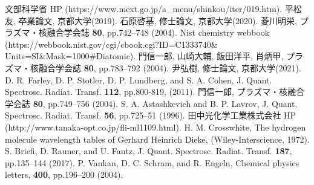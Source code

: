 \begin{thebibliography}{99}
     文部科学省 HP (https://www.mext.go.jp/a\_menu/shinkou/iter/019.htm).
     平松友, 卒業論文, 京都大学(2019).
     石原啓基, 修士論文, 京都大学(2020).
     菱川明栄, プラズマ・核融合学会誌 \textbf{80}, pp.742–748 (2004).
     Nist chemistry webbook (https://webbook.nist.gov/cgi/cbook.cgi?ID=C1333740\&\\Units=SI\&Mask=1000\#Diatomic).
     門信一郎, 山崎大輔, 飯田洋平, 肖炳甲, プラズマ・核融合学会誌 \textbf{80}, pp.783–792 (2004).
     尹弘樹, 修士論文, 京都大学(2021).
     D. R. Farley, D. P. Stotler, D. P. Lundberg, and S. A. Cohen, J. Quant. Spectrosc. Radiat. Transf. \textbf{112}, pp.800-819, (2011).
     門信一郎, プラズマ・核融合学会誌 \textbf{80}, pp.749–756 (2004).
     S. A. Astashkevich and B. P. Lavrov, J. Quant. Spectrosc. Radiat. Transf. \textbf{56}, pp.725–51 (1996).
     田中光化学工業株式会社 HP (http://www.tanaka-opt.co.jp/fli-ml1109.html).
     H. M. Crosswhite, The hydrogen molecule wavelength tables of Gerhard Heinrich Dieke, (Wiley-Interscience, 1972).
     S. Briefi, D. Rauner, and U. Fantz, J. Quant. Spectrosc. Radiat. Transf. \textbf{187}, pp.135–144 (2017).
     P. Vankan, D. C. Schram, and R. Engeln, Chemical physics letters, \textbf{400}, pp.196–200 (2004).
\end{thebibliography}